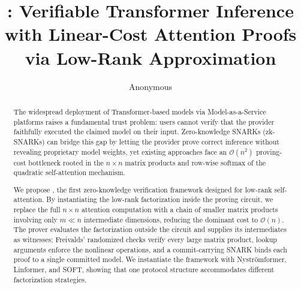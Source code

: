 \documentclass[runningheads]{llncs}
\begin{document}
\title{\name: Verifiable Transformer Inference with Linear-Cost Attention Proofs via Low-Rank Approximation}

\author{Anonymous}


\institute{}

\maketitle

\begin{abstract}
  The widespread deployment of Transformer-based models via Model-as-a-Service platforms raises a fundamental trust problem: users cannot verify that the provider faithfully executed the claimed model on their input. Zero-knowledge SNARKs (zk-SNARKs) can bridge this gap by letting the provider prove correct inference without revealing proprietary model weights, yet existing approaches face an $\mathcal{O}(n^2)$ proving-cost bottleneck rooted in the $n \times n$ matrix products and row-wise softmax of the quadratic self-attention mechanism.

  We propose \name, the first zero-knowledge verification framework designed for low-rank self-attention. By instantiating the low-rank factorization inside the proving circuit, we replace the full $n \times n$ attention computation with a chain of smaller matrix products involving only $m \ll n$ intermediate dimensions, reducing the dominant cost to $\mathcal{O}(n)$. The prover evaluates the factorization outside the circuit and supplies its intermediates as witnesses; Freivalds' randomized checks verify every large matrix product, lookup arguments enforce the nonlinear operations, and a commit-carrying SNARK binds each proof to a single committed model. We instantiate the framework with Nystr\"{o}mformer, Linformer, and SOFT, showing that one protocol structure accommodates different factorization strategies.
  
\end{abstract}

\end{document}

